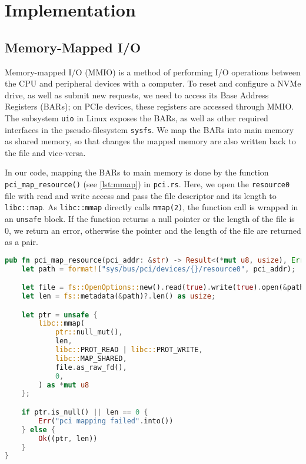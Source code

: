 \chapter{Implementation}\label{chapter:implementation}
\section{Memory-Mapped I/O}\label{section:MMIO}
Memory-mapped I/O (MMIO) is a method of performing I/O operations between the CPU and peripheral devices with a computer. To reset and configure a NVMe drive, as well as submit new requests, we need to access its Base Address Registers (BARs); on PCIe devices, these registers are accessed through MMIO. The subsystem \texttt{uio} in Linux exposes the BARs, as well as other required interfaces in the pseudo-filesystem \texttt{sysfs}. We map the BARs into main memory as shared memory, so that changes the mapped memory are also written back to the file and vice-versa.

In our code, mapping the BARs to main memory is done by the function \texttt{pci\_map\_resource()} (see \autoref{lst:mmap}) in \texttt{pci.rs}. Here, we open the \texttt{resource0} file with read and write access and pass the file descriptor and its length to \texttt{libc::map}. As \texttt{libc::mmap} directly calls \texttt{mmap(2)}, the function call is wrapped in an \texttt{unsafe} block. If the function returns a null pointer or the length of the file is 0, we return an error, otherwise the pointer and the length of the file are returned as a pair.

\begin{lstlisting}[float, language=Rust,label=lst:mmap,caption=Memory mapping a PCI resource in Rust]
pub fn pci_map_resource(pci_addr: &str) -> Result<(*mut u8, usize), Error> {
    let path = format!("sys/bus/pci/devices/{}/resource0", pci_addr);

    let file = fs::OpenOptions::new().read(true).write(true).open(&path)?;
    let len = fs::metadata(&path)?.len() as usize;

    let ptr = unsafe {
        libc::mmap(
            ptr::null_mut(),
            len,
            libc::PROT_READ | libc::PROT_WRITE,
            libc::MAP_SHARED,
            file.as_raw_fd(),
            0,
        ) as *mut u8
    };

    if ptr.is_null() || len == 0 {
        Err("pci mapping failed".into())
    } else {
        Ok((ptr, len))
    }
}
\end{lstlisting}

